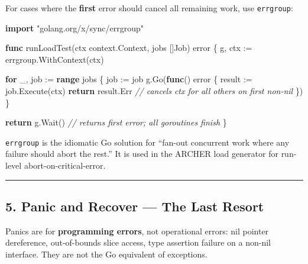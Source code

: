 \documentclass[
]{article}
\newenvironment{Shaded}{}{}
\newcommand{\CommentTok}[1]{\textcolor[rgb]{0.38,0.63,0.69}{\textit{#1}}}
\newcommand{\ControlFlowTok}[1]{\textcolor[rgb]{0.00,0.44,0.13}{\textbf{#1}}}
\newcommand{\DataTypeTok}[1]{\textcolor[rgb]{0.56,0.13,0.00}{#1}}
\newcommand{\KeywordTok}[1]{\textcolor[rgb]{0.00,0.44,0.13}{\textbf{#1}}}
\newcommand{\NormalTok}[1]{#1}
\newcommand{\OperatorTok}[1]{\textcolor[rgb]{0.40,0.40,0.40}{#1}}
\newcommand{\StringTok}[1]{\textcolor[rgb]{0.25,0.44,0.63}{#1}}
\begin{document}
For cases where the \textbf{first} error should cancel all remaining
work, use \texttt{errgroup}:

\begin{Shaded}
\begin{Highlighting}[]
\KeywordTok{import} \StringTok{"golang.org/x/sync/errgroup"}

\KeywordTok{func}\NormalTok{ runLoadTest}\OperatorTok{(}\NormalTok{ctx context}\OperatorTok{.}\NormalTok{Context}\OperatorTok{,}\NormalTok{ jobs }\OperatorTok{[]}\NormalTok{Job}\OperatorTok{)} \DataTypeTok{error} \OperatorTok{\{}
\NormalTok{    g}\OperatorTok{,}\NormalTok{ ctx }\OperatorTok{:=}\NormalTok{ errgroup}\OperatorTok{.}\NormalTok{WithContext}\OperatorTok{(}\NormalTok{ctx}\OperatorTok{)}

    \ControlFlowTok{for}\NormalTok{ \_}\OperatorTok{,}\NormalTok{ job }\OperatorTok{:=} \KeywordTok{range}\NormalTok{ jobs }\OperatorTok{\{}
\NormalTok{        job }\OperatorTok{:=}\NormalTok{ job}
\NormalTok{        g}\OperatorTok{.}\NormalTok{Go}\OperatorTok{(}\KeywordTok{func}\OperatorTok{()} \DataTypeTok{error} \OperatorTok{\{}
\NormalTok{            result }\OperatorTok{:=}\NormalTok{ job}\OperatorTok{.}\NormalTok{Execute}\OperatorTok{(}\NormalTok{ctx}\OperatorTok{)}
            \ControlFlowTok{return}\NormalTok{ result}\OperatorTok{.}\NormalTok{Err }\CommentTok{// cancels ctx for all others on first non{-}nil}
        \OperatorTok{\})}
    \OperatorTok{\}}

    \ControlFlowTok{return}\NormalTok{ g}\OperatorTok{.}\NormalTok{Wait}\OperatorTok{()} \CommentTok{// returns first error; all goroutines finish}
\OperatorTok{\}}
\end{Highlighting}
\end{Shaded}

\texttt{errgroup} is the idiomatic Go solution for ``fan-out concurrent
work where any failure should abort the rest.'' It is used in the ARCHER
load generator for run-level abort-on-critical-error.

\begin{center}\rule{0.5\linewidth}{0.5pt}\end{center}

\hypertarget{panic-and-recover-the-last-resort}{%
\subsection{5. Panic and Recover --- The Last
Resort}\label{panic-and-recover-the-last-resort}}

Panics are for \textbf{programming errors}, not operational errors: nil
pointer dereference, out-of-bounds slice access, type assertion failure
on a non-nil interface. They are not the Go equivalent of exceptions.
\end{document}
